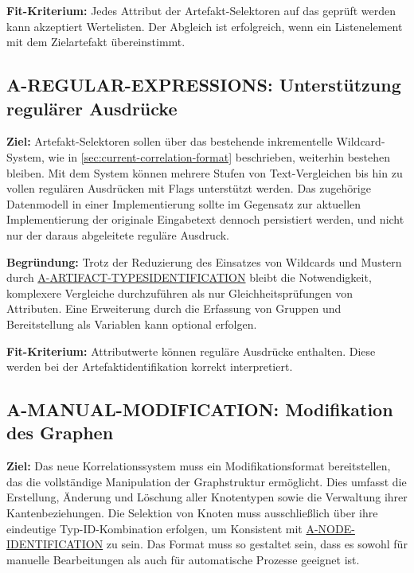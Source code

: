 \textbf{Fit-Kriterium:}
Jedes Attribut der Artefakt-Selektoren auf das geprüft werden kann akzeptiert Wertelisten.
Der Abgleich ist erfolgreich, wenn ein Listenelement mit dem Zielartefakt übereinstimmt.

\subsection{A-REGULAR-EXPRESSIONS: Unterstützung regulärer Ausdrücke}\label{subsec:req-regex-support}

\textbf{Ziel:}
Artefakt-Selektoren sollen über das bestehende inkrementelle Wildcard-System, wie in \autoref{sec:current-correlation-format} beschrieben, weiterhin bestehen bleiben.
Mit dem System können mehrere Stufen von Text-Vergleichen bis hin zu vollen regulären Ausdrücken mit Flags unterstützt werden.
Das zugehörige Datenmodell in einer Implementierung sollte im Gegensatz zur aktuellen Implementierung der originale Eingabetext dennoch persistiert werden, und nicht nur der daraus abgeleitete reguläre Ausdruck.

\textbf{Begründung:}
Trotz der Reduzierung des Einsatzes von Wildcards und Mustern durch \hyperref[subsec:req-type-specific-matching]{A-ARTIFACT-TYPESIDENTIFICATION} bleibt die Notwendigkeit, komplexere Vergleiche durchzuführen als nur Gleichheitsprüfungen von Attributen.
Eine Erweiterung durch die Erfassung von Gruppen und Bereitstellung als Variablen kann optional erfolgen.

\textbf{Fit-Kriterium:}
Attributwerte können reguläre Ausdrücke enthalten.
Diese werden bei der Artefaktidentifikation korrekt interpretiert.

\subsection{A-MANUAL-MODIFICATION: Modifikation des Graphen}\label{subsec:req-manual-format-modification}

\textbf{Ziel:}
Das neue Korrelationssystem muss ein Modifikationsformat bereitstellen, das die vollständige Manipulation der Graphstruktur ermöglicht.
Dies umfasst die Erstellung, Änderung und Löschung aller Knotentypen sowie die Verwaltung ihrer Kantenbeziehungen.
Die Selektion von Knoten muss ausschließlich über ihre eindeutige Typ-ID-Kombination erfolgen, um Konsistent mit \hyperref[subsec:req-node-id-type]{A-NODE-IDENTIFICATION} zu sein.
Das Format muss so gestaltet sein, dass es sowohl für manuelle Bearbeitungen als auch für automatische Prozesse geeignet ist.

